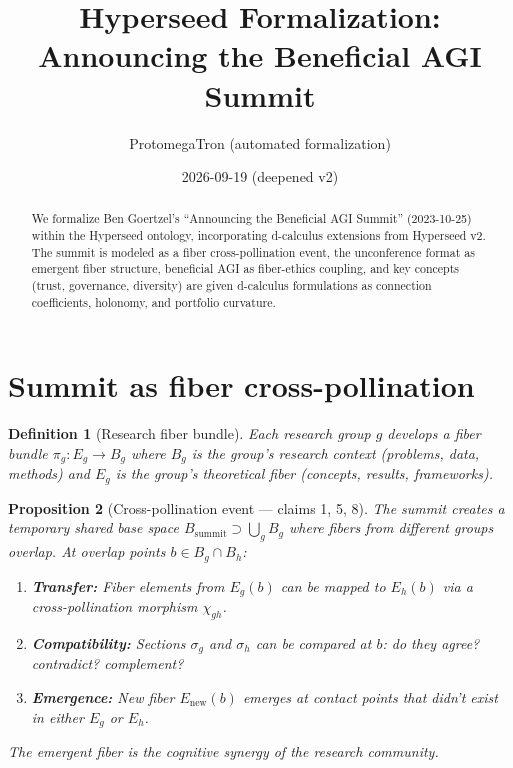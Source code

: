 \documentclass[11pt,a4paper]{article}
\title{Hyperseed Formalization:\\
  Announcing the Beneficial AGI Summit}
\author{ProtomegaTron (automated formalization)}
\date{2026-09-19 (deepened v2)}
\newtheorem{definition}{Definition}[section]
\newtheorem{proposition}[definition]{Proposition}
\begin{document}
\maketitle

\begin{abstract}
We formalize Ben Goertzel's ``Announcing the Beneficial AGI Summit''
(2023-10-25) within the Hyperseed ontology, incorporating d-calculus
extensions from Hyperseed v2. The summit is modeled as a fiber
cross-pollination event, the unconference format as emergent fiber
structure, beneficial AGI as fiber-ethics coupling, and key concepts
(trust, governance, diversity) are given d-calculus formulations as
connection coefficients, holonomy, and portfolio curvature.
\end{abstract}

\tableofcontents

\section{Summit as fiber cross-pollination}

\begin{definition}[Research fiber bundle]
Each research group $g$ develops a fiber bundle
$\pi_g: E_g \to B_g$ where $B_g$ is the group's research context
(problems, data, methods) and $E_g$ is the group's theoretical fiber
(concepts, results, frameworks).
\end{definition}

\begin{proposition}[Cross-pollination event --- claims 1, 5, 8]
\label{prop:cross}
The summit creates a temporary shared base space
$B_{\text{summit}} \supset \bigcup_g B_g$ where fibers from different
groups overlap. At overlap points $b \in B_g \cap B_h$:
\begin{enumerate}
  \item \textbf{Transfer:} Fiber elements from $E_g(b)$ can be mapped
    to $E_h(b)$ via a cross-pollination morphism $\chi_{gh}$.
  \item \textbf{Compatibility:} Sections $\sigma_g$ and $\sigma_h$
    can be compared at $b$: do they agree? contradict? complement?
  \item \textbf{Emergence:} New fiber $E_{\text{new}}(b)$ emerges at
    contact points that didn't exist in either $E_g$ or $E_h$.
\end{enumerate}
The emergent fiber is the cognitive synergy of the research community.
\end{proposition}
\end{document}

